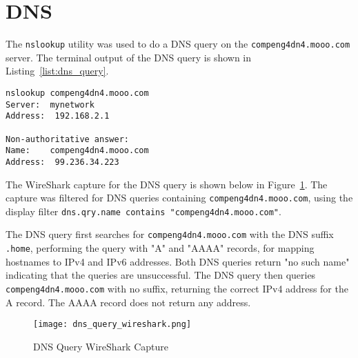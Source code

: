 \section*{DNS}
The \texttt{nslookup} utility was used to do a DNS query on the \texttt{compeng4dn4.mooo.com} server. The terminal output of the DNS query is shown in Listing~\ref{list:dns_query}.

\begin{lstlisting}[caption=DNS Query Terminal Output,label=list:dns_query]
nslookup compeng4dn4.mooo.com
Server:  mynetwork
Address:  192.168.2.1

Non-authoritative answer:
Name:    compeng4dn4.mooo.com
Address:  99.236.34.223
\end{lstlisting}

The WireShark capture for the DNS query is shown below in Figure~\ref{fig:dns_query}. The capture was filtered for DNS queries containing \texttt{compeng4dn4.mooo.com}, using the display filter \texttt{dns.qry.name contains "compeng4dn4.mooo.com"}. 

The DNS query first searches for \texttt{compeng4dn4.mooo.com} with the DNS suffix \texttt{.home}, performing the query with "A" and "AAAA" records, for mapping hostnames to IPv4 and IPv6 addresses. Both DNS queries return "no such name" indicating that the queries are unsuccessful. The DNS query then queries \texttt{compeng4dn4.mooo.com} with no suffix, returning the correct IPv4 address for the A record. The AAAA record does not return any address.

\begin{figure}[htp]
\centering
\caption[dns_query]{DNS Query WireShark Capture}\label{fig:dns_query}
\texttt{[image: dns\_query\_wireshark.png]}
\end{figure}